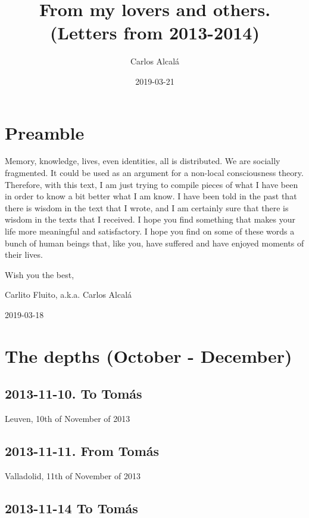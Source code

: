 \documentclass[]{book}
\title{From my lovers and others. (Letters from 2013-2014)}
\author{Carlos Alcalá}
\date{2019-03-21}
\begin{document}
\maketitle

{
\setcounter{tocdepth}{1}
\tableofcontents
}
\hypertarget{preamble}{%
\chapter{Preamble}\label{preamble}}

Memory, knowledge, lives, even identities, all is distributed. We are socially fragmented. It could be used as an argument for a non-local consciousness theory. Therefore, with this text, I am just trying to compile pieces of what I have been in order to know a bit better what I am know. I have been told in the past that there is wisdom in the text that I wrote, and I am certainly sure that there is wisdom in the texts that I received. I hope you find something that makes your life more meaningful and satisfactory. I hope you find on some of these words a bunch of human beings that, like you, have suffered and have enjoyed moments of their lives.

Wish you the best,

Carlito Fluito, a.k.a. Carlos Alcalá

2019-03-18

\hypertarget{depths}{%
\chapter{The depths (October - December)}\label{depths}}

\hypertarget{to-tomas}{%
\section{2013-11-10. To Tomás}\label{to-tomas}}

Leuven, 10th of November of 2013

\hypertarget{from-tomas}{%
\section{2013-11-11. From Tomás}\label{from-tomas}}

Valladolid, 11th of November of 2013

\hypertarget{to-tomas-1}{%
\section{2013-11-14 To Tomás}\label{to-tomas-1}}
\end{document}
